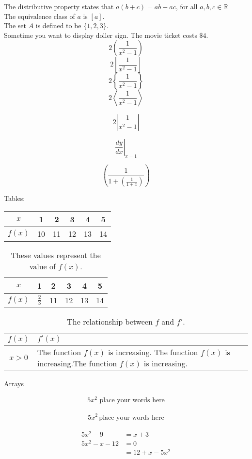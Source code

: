\documentclass[12pt]{article}
\begin{document}
The distributive property states that $a(b+c)=ab+ac$, for all $a, b, c \in \mathbb{R}$\\[6pt]
The equivalence class of $a$ is $[a]$.\\[6pt]
The set $A$ is defined to be $\{1,2,3\}$.\\[6pt]
Sometime you want to display doller sign. The movie ticket costs $\$4$.\\[6pt]

$$2\left(\frac{1}{x^2-1}\right)$$
$$2\left[\frac{1}{x^2-1}\right]$$
$$2\left\{\frac{1}{x^2-1}\right\}$$
$$2\left\langle\frac{1}{x^2-1}\right\rangle$$

$$2\left|\frac{1}{x^2-1}\right|$$

$$\left.\frac{dy}{dx}\right|_{x=1}$$

$$ \left(\frac{1}{1+ \left(\frac{1}{1+x}\right)}\right)   $$



Tables:\\

\begin{tabular}{|c||c|c|c|c|c|}
\hline
$x$ & 1 & 2 & 3 & 4 & 5\\ \hline
$f(x)$ & 10 & 11 & 12 & 13 & 14 \\ \hline

\end{tabular}

\vspace{1cm}

\begin{table}[H]
\centering
\def\arraystretch{1.3}
\begin{tabular}{|c||c|c|c|c|c|}
\hline
$x$ & 1 & 2 & 3 & 4 & 5\\ \hline
$f(x)$ & $\frac{2}{3}$ & 11 & 12 & 13 & 14 \\ \hline
\end{tabular} 
\caption{These values represent the value of $f(x)$.}
\end{table}

\vspace{1cm}

\begin{table}[H]
\caption{The relationship between $f$ and $f'$.}
\centering
\def\arraystretch{1.3}
\begin{tabular}{|c|p{8cm}|}
\hline
$f(x)$ & $f'(x)$\\ \hline
$x>0$ & The function $f(x)$ is increasing. The function $f(x)$ is increasing.The function $f(x)$ is increasing.\\ \hline
\end{tabular} 
\end{table}

Arrays 


\begin{align}
5x^2 \text{ place your words here}
\end{align}

\begin{align}
5x^2\, \text{place your words here}
\end{align}

\begin{align}
5x^2-9&=x+3\\
5x^2-x-12&=0\\
&=12+x-5x^2
\end{align}
\end{document}
